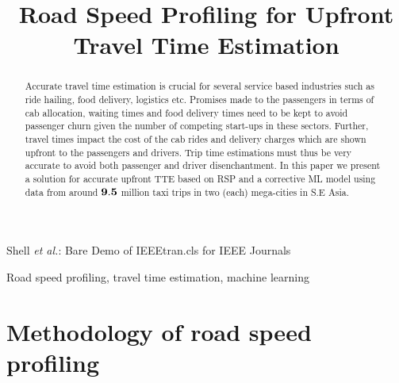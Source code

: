 \documentclass[conference]{IEEEtran}
\begin{document}
\title{Road Speed Profiling for Upfront Travel Time Estimation
}
\author{

}

%
{Shell \MakeLowercase{\textit{et al.}}: Bare Demo of IEEEtran.cls for IEEE Journals}

\maketitle

\begin{abstract}
 Accurate travel time estimation is crucial for several service based industries such as ride hailing, food delivery, logistics etc. Promises made to the passengers in terms of cab allocation, waiting times and food delivery times need to be kept to avoid passenger churn given the number of competing start-ups in these sectors. Further, travel times impact the cost of the cab rides and delivery charges which are shown upfront to the passengers and drivers. Trip time estimations must thus be very accurate to avoid both passenger and driver disenchantment. In this paper we present a solution for accurate upfront \ac{TTE} based on \ac{RSP} and a corrective \ac{ML} model using data from around $\bf{9.5}$ million taxi trips in two (each) mega-cities in S.E Asia. 

\end{abstract}


\begin{IEEEkeywords}
Road speed profiling, travel time estimation, machine learning
\end{IEEEkeywords}


\IEEEpeerreviewmaketitle




\section{Methodology of road speed profiling}
\label{sec:road-speed-profiling-details}
\end{document}
